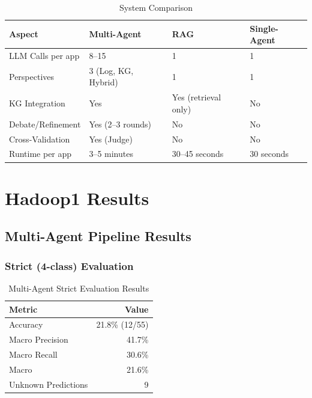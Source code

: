 \begin{table}[H]
\centering
\caption{System Comparison}
\label{tab:systems}
\begin{tabular}{llll}
\toprule
\textbf{Aspect}         & \textbf{Multi-Agent}    & \textbf{RAG}          & \textbf{Single-Agent} \\
\midrule
LLM Calls per app       & 8--15                   & 1                     & 1 \\
Perspectives            & 3 (Log, KG, Hybrid)     & 1                     & 1 \\
KG Integration          & Yes                     & Yes (retrieval only)  & No \\
Debate/Refinement       & Yes (2--3 rounds)       & No                    & No \\
Cross-Validation        & Yes (Judge)             & No                    & No \\
Runtime per app         & 3--5 minutes            & 30--45 seconds        & 30 seconds \\
\bottomrule
\end{tabular}
\end{table}

\section{Hadoop1 Results}

\subsection{Multi-Agent Pipeline Results}

\subsubsection{Strict (4-class) Evaluation}

\begin{table}[H]
\centering
\caption{Multi-Agent Strict Evaluation Results}
\label{tab:ma-strict}
\begin{tabular}{lr}
\toprule
\textbf{Metric} & \textbf{Value} \\
\midrule
Accuracy          & 21.8\% (12/55) \\
Macro Precision   & 41.7\% \\
Macro Recall      & 30.6\% \\
Macro \fone{}     & 21.6\% \\
Unknown Predictions & 9 \\
\bottomrule
\end{tabular}
\end{table}

